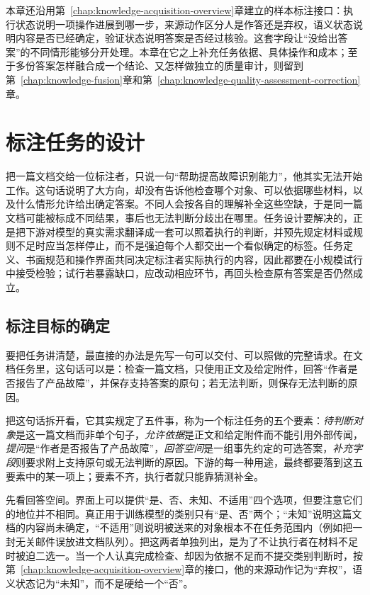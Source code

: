 本章还沿用第~\ref{chap:knowledge-acquisition-overview}章建立的样本标注接口：执行状态说明一项操作进展到哪一步，来源动作区分人是作答还是弃权，语义状态说明内容是否已经确定，验证状态说明答案是否经过核验。这套字段让“没给出答案”的不同情形能够分开处理。本章在它之上补充任务依据、具体操作和成本；至于多份答案怎样融合成一个结论、又怎样做独立的质量审计，则留到第~\ref{chap:knowledge-fusion}章和第~\ref{chap:knowledge-quality-assessment-correction}章。

\section{标注任务的设计}
\label{sec:knowledge-acquisition-human-task-design}

把一篇文档交给一位标注者，只说一句“帮助提高故障识别能力”，他其实无法开始工作。这句话说明了大方向，却没有告诉他检查哪个对象、可以依据哪些材料，以及什么情形允许给出确定答案。不同人会按各自的理解补全这些空缺，于是同一篇文档可能被标成不同结果，事后也无法判断分歧出在哪里。任务设计要解决的，正是把下游对模型的真实需求翻译成一套可以照着执行的判断，并预先规定材料或规则不足时应当怎样停止，而不是强迫每个人都交出一个看似确定的标签。任务定义、书面规范和操作界面共同决定标注者实际执行的内容，因此都要在小规模试行中接受检验；试行若暴露缺口，应改动相应环节，再回头检查原有答案是否仍然成立。

\subsection{标注目标的确定}
\label{sec:knowledge-acquisition-human-task-objective}

要把任务讲清楚，最直接的办法是先写一句可以交付、可以照做的完整请求。在文档任务里，这句话可以是：检查一篇文档，只使用正文及给定附件，回答“作者是否报告了产品故障”，并保存支持答案的原句；若无法判断，则保存无法判断的原因。

把这句话拆开看，它其实规定了五件事，称为一个标注任务的五个要素：\emph{待判断对象}是这一篇文档而非单个句子，\emph{允许依据}是正文和给定附件而不能引用外部传闻，\emph{提问}是“作者是否报告了产品故障”，\emph{回答空间}是一组事先约定的可选答案，\emph{补充字段}则要求附上支持原句或无法判断的原因。下游的每一种用途，最终都要落到这五要素中的某一项上；要素不齐，执行者就只能靠猜测补全。

先看回答空间。界面上可以提供“是、否、未知、不适用”四个选项，但要注意它们的地位并不相同。真正用于训练模型的类别只有“是、否”两个；“未知”说明这篇文档的内容尚未确定，“不适用”则说明被送来的对象根本不在任务范围内（例如把一封无关邮件误放进文档队列）。把这两者单独列出，是为了不让执行者在材料不足时被迫二选一。当一个人认真完成检查、却因为依据不足而不提交类别判断时，按第~\ref{chap:knowledge-acquisition-overview}章的接口，他的来源动作记为“弃权”，语义状态记为“未知”，而不是硬给一个“否”。

